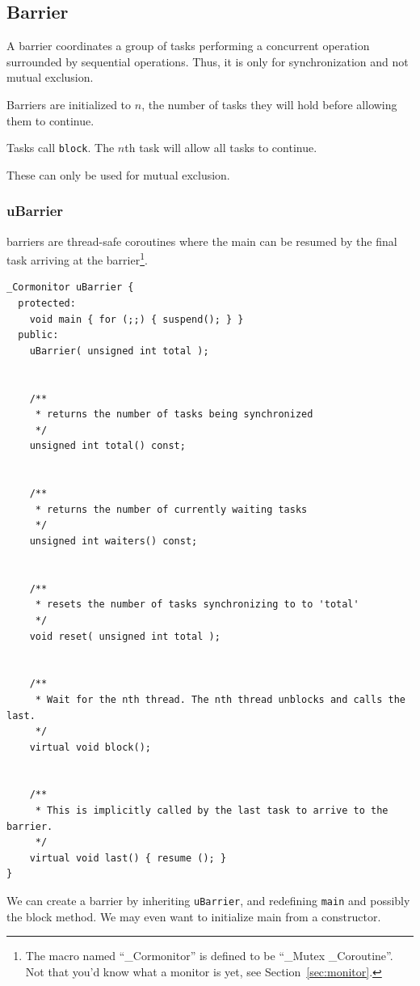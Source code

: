             \subsection{Barrier} %
            \label{sub:barrier}
                A barrier coordinates a group of tasks performing a concurrent operation surrounded by sequential operations.
                Thus, it is only for synchronization and not mutual exclusion.

                Barriers are initialized to $n$, the number of tasks they will hold before allowing them to continue.

                Tasks call \verb|block|.
                The $n$th task will allow all tasks to continue.

                These can only be used for mutual exclusion.
                \subsubsection{uBarrier} %
                \label{ssub:ubarrier}
                    \uC barriers are thread-safe coroutines where the main can be resumed by the final task arriving at the barrier\footnote{The macro named ``\_Cormonitor'' is defined to be ``\_Mutex \_Coroutine''. Not that you'd know what a monitor is yet, see Section~\ref{sec:monitor}.}.
                    \begin{lstlisting}
_Cormonitor uBarrier {
  protected:
    void main { for (;;) { suspend(); } }
  public:
    uBarrier( unsigned int total );


    /**
     * returns the number of tasks being synchronized
     */
    unsigned int total() const;


    /**
     * returns the number of currently waiting tasks
     */
    unsigned int waiters() const;


    /**
     * resets the number of tasks synchronizing to to 'total'
     */
    void reset( unsigned int total );


    /**
     * Wait for the nth thread. The nth thread unblocks and calls the last.
     */
    virtual void block();


    /**
     * This is implicitly called by the last task to arrive to the barrier.
     */
    virtual void last() { resume (); }
}
                    \end{lstlisting}
                    We can create a barrier by inheriting \verb|uBarrier|, and redefining \verb|main| and possibly the block method.
                    We may even want to initialize main from a constructor.
